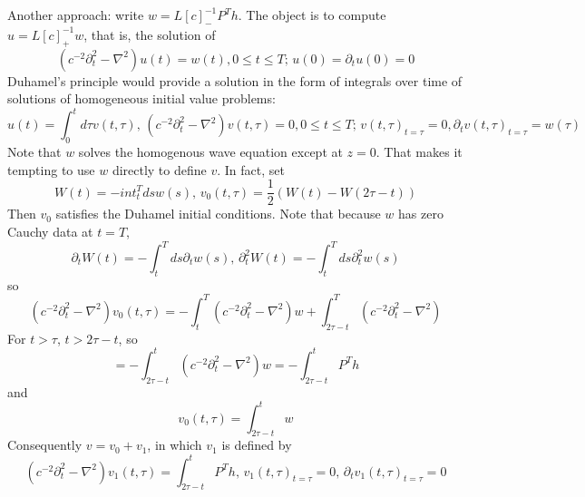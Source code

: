 
Another approach: write $w = L[c]^{-1}_-P^T h$. The object is to compute $u=L[c]^{-1}_+w$, that is, the solution of 
\[
(c^{-2}\partial_t^2 - \nabla^2)u(t) = w(t), 0\le t \le T; \,u(0) = \partial_t u(0) = 0
\]
Duhamel's principle would provide a solution in the form of integrals over time of solutions of homogeneous initial value problems:
\[
u(t) = \int_0^t d\tau v(t,\tau), \, (c^{-2}\partial_t^2 - \nabla^2)v(t,\tau) = 0, 0\le t \le T; \,v(t,\tau)_{t=\tau} = 0, \partial_t v(t,\tau)_{t=\tau} = w(\tau)
\]
Note that $w$ solves the homogenous wave equation except at $z=0$. That makes it tempting to use $w$ directly to define $v$. In fact, set 
\[
W(t) = -int_t^T ds w(s),\,v_0(t,\tau) = \frac{1}{2}(W(t) - W(2\tau-t)) 
\]
Then $v_0$ satisfies the Duhamel initial conditions. Note that because $w$ has zero Cauchy data at $t=T$,
\[
\partial_t W(t)= -\int_t^T ds \partial_t w(s),\,\partial_t^2 W(t)=-\int_t^T ds \partial^2_t w(s)
\]
so 
\[
(c^{-2}\partial_t^2 - \nabla^2)v_0(t,\tau) = -\int_t^T(c^{-2}\partial^2_t -\nabla^2)w + \int_{2\tau-t}^T(c^{-2}\partial^2_t -\nabla^2)
\]
For $t>\tau$, $t > 2\tau-t$, so 
\[
= -\int_{2\tau-t}^t(c^{-2}\partial^2_t -\nabla^2)w = -\int_{2\tau-t}^t P^Th
\]
and 
\[ 
v_0(t,\tau) = \int_{2\tau-t}^t w  
\] 
Consequently $v=v_0 + v_1$, in which $v_1$ is defined by 
\[
(c^{-2}\partial_t^2 - \nabla^2)v_1(t,\tau) = \int_{2\tau-t}^t P^Th, \,  v_1(t,\tau)_{t=\tau} = 0, \,  \partial_t v_1(t,\tau)_{t=\tau} = 0
\]


